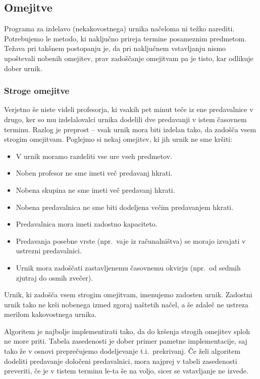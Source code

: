 \documentclass[10pt, a4paper]{article}
\begin{document}
\subsection{Omejitve}

Programa za izdelavo (nekakovostnega) urnika načeloma ni težko narediti. Potrebujemo
le metodo, ki naključno prireja termine posameznim predmetom. Težava pri takšnem postopanju
je, da pri naključnem vstavljanju nismo upoštevali nobenih omejitev, prav zadoščanje omejitvam
pa je tisto, kar odlikuje dober urnik.

\subsubsection{Stroge omejitve}

Verjetno še niste videli profesorja, ki vsakih pet minut teče iz ene predavalnice v drugo,
ker so mu izdelalovalci urnika dodelili dve predavanji v istem časovnem terminu. Razlog
je preprost -- vsak urnik mora biti izdelan tako, da zadošča vsem strogim omejitvam.
Poglejmo si nekaj omejitev, ki jih urnik ne sme kršiti:
\begin{itemize}
   \item V urnik moramo razdeliti vse ure vseh predmetov.
   \item Noben profesor ne sme imeti več predavanj hkrati.
   \item Nobena skupina ne sme imeti več predavanj hkrati.
   \item Nobena predavalnica ne sme biti dodeljena večim predavanjem hkrati.
   \item Predavalnica mora imeti zadostno kapaciteto.
   \item Predavanja posebne vrste (npr.\ vaje iz računalništva) se morajo izvajati v ustrezni predavalnici.
   \item Urnik mora zadoščati zastavljenemu časovnemu okvirju (npr.\ od sedmih zjutraj do osmih zvečer).
\end{itemize}
\noindent
Urnik, ki zadošča vsem strogim omejitvam, imenujemo zadosten urnik. Zadostni urnik tako ne
krši nobenega izmed zgoraj naštetih načel, a še zdaleč ne ustreza merilom kakovostnega urnika.

Algoritem je najbolje implementirati tako, da do kršenja strogih omejitev sploh ne more priti.
Tabela zasedenosti je dober primer pametne implementacije, saj tako že v osnovi  preprečujemo
dodeljevanje t.i.\ prekrivanj. Če želi algoritem dodeliti predavanje določeni predavalnici,
mora najprej v tabeli zasedenosti preveriti, če je v tistem terminu le-ta še na voljo,
sicer se vstavljanje ne izvede.
\end{document}
